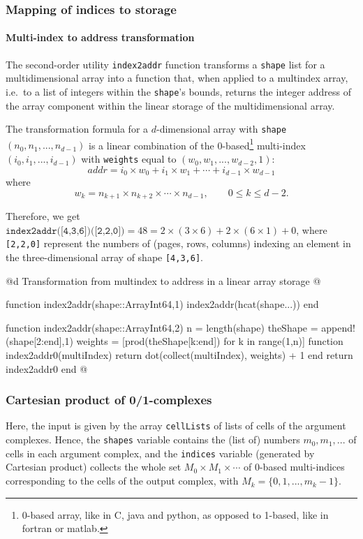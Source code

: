 \subsubsection{Mapping of indices to storage}

\paragraph{Multi-index to address transformation}
The second-order utility \texttt{index2addr} function transforms a \texttt{shape} list for a multidimensional array into a function that, when applied to a multindex array, i.e.~to a list of integers within the \texttt{shape}'s bounds, returns the integer address of the array component within the linear storage of the multidimensional array.

The transformation formula for a $d$-dimensional array with \texttt{shape} $(n_0,n_1,...,n_{d-1})$ is a linear combination of the 0-based\footnote{0-based array, like in C, java and python, as opposed to 1-based, like in fortran or matlab.} multi-index $(i_0,i_1,...,i_{d-1})$ with \texttt{weights} equal to $(w_0,w_1,...,w_{d-2},1)$:
\[
addr = i_0\times w_0 +i_1\times w_1 +\cdots +i_{d-1}\times w_{d-1}
\]
where 
\[
w_k = n_{k+1} \times n_{k+2} \times\cdots\times  n_{d-1}, \qquad 0\leq k\leq d-2.
\]

Therefore, we get $\texttt{index2addr([4,3,6])([2,2,0])}=48= 2\times(3\times 6)+2\times(6\times 1)+0$,
where \texttt{[2,2,0]} represent the numbers of (pages, rows, columns) indexing an element in the three-dimensional array of shape \texttt{[4,3,6]}.

@d Transformation from multindex to address in a linear array storage
@{function index2addr(shape::Array{Int64,1})
	index2addr(hcat(shape...))
end

function index2addr(shape::Array{Int64,2})
    n = length(shape)
    theShape = append!(shape[2:end],1)
    weights = [prod(theShape[k:end]) for k in range(1,n)]
    function index2addr0(multiIndex)
        return dot(collect(multiIndex), weights) + 1
    end
    return index2addr0
end
@}


\subsubsection{Cartesian product of 0/1-complexes}
Here, the input is given by the array \texttt{cellLists} of lists of cells of the argument complexes. Hence, the \texttt{shapes} variable contains the (list of) numbers $m_0, m_1, ...$ of cells in each argument complex, and the \texttt{indices} variable (generated by Cartesian product) collects the whole set $M_0 \times M_1 \times \cdots$ of 0-based multi-indices corresponding to the cells of the output complex, with $M_k = \{0,1,...,m_{k}-1\}$.

